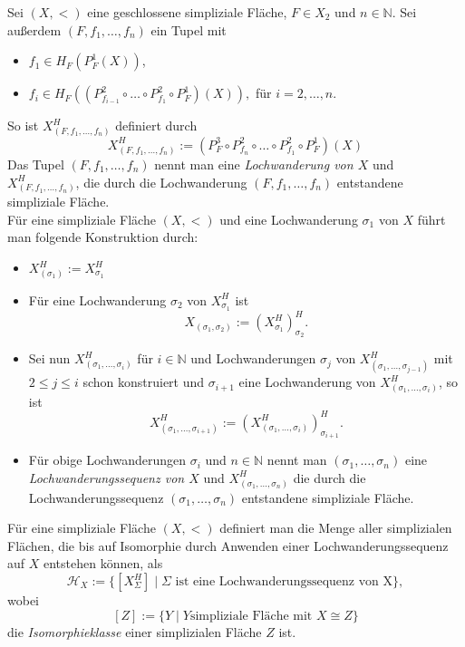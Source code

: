 \documentclass[12pt,titlepage]{article}
\begin{document}
\begin{definition}
Sei $(X,<)$ eine geschlossene simpliziale Fläche, $F \in X_2$ und $n\in \mathbb{N}$. Sei außerdem $(F,f_1,\ldots,f_n)$ ein Tupel mit
\begin{itemize}
\item $f_1 \in H_F(P_F^1(X))$,
\item $f_i \in H_F((P^2_{f_{i-1}} \circ \ldots \circ P^2_{f_1}\circ P_F^1 )(X)),$ für $i=2,\ldots ,n$.
\end{itemize}
So ist $X_{(F,f_1,\ldots,f_n)}^H$ definiert durch 
\[
X^{H}_{(F,f_1,\ldots,f_n)}:=(P_F^3\circ P^2_{f_n} \circ \ldots \circ P^2_{f_1}\circ P_F^1)(X)
\]
Das Tupel $(F,f_1,\ldots,f_n)$ nennt man eine \emph{Lochwanderung von $X$} und $X^H_{(F,f_1,\ldots,f_n)}$, die durch die Lochwanderung $(F,f_1,\ldots,f_n)$ entstandene simpliziale Fläche.\\
Für eine simpliziale Fläche $(X,<)$ und eine Lochwanderung $\sigma_1$ von $X$ führt man folgende Konstruktion durch:
\begin{itemize}
\item $X^H_{(\sigma_1)}:=X^H_{\sigma_1}$
\item Für eine Lochwanderung $\sigma_2$ von $X^H_{\sigma_1}$ ist 
\[
X_{(\sigma_1,\sigma_2)}:=(X_{\sigma_1}^H)^H_{\sigma_2}.
\]
\item Sei nun  $X_{(\sigma_1,\ldots, \sigma_i)}^H$ für $i\in \mathbb{N}$ und Lochwanderungen $\sigma_j$ von $X^H_{(\sigma_1,\ldots,\sigma_{j-1})}$ mit $2 \leq j \leq i$ schon konstruiert und $\sigma_{i+1}$ eine Lochwanderung von $X_{(\sigma_1,\ldots, \sigma_i)}^H$, so ist
\[
X_{(\sigma_1,\ldots, \sigma_{i+1})}^H:=(X_{(\sigma_1,\ldots, \sigma_i)}^H)^H_{\sigma_{i+1}}.
\]
\item Für obige Lochwanderungen $\sigma_i$ und $n \in \mathbb{N}$ nennt man $(\sigma_1, \ldots,\sigma_n)$ eine \emph{Lochwanderungssequenz von $X$} und $X^H_{(\sigma_1,\ldots,\sigma_n)}$ die durch die Lochwanderungssequenz $(\sigma_1,\ldots,\sigma_n)$ entstandene simpliziale Fläche.
\end{itemize}
\end{definition}


\begin{definition}
Für eine simpliziale Fläche $(X,<)$ definiert man die Menge aller simplizialen Flächen, die bis auf Isomorphie durch Anwenden einer Lochwanderungssequenz auf $X$ entstehen können, als
\[
\mathcal{H}_X:=\{[X_{\Sigma}^H] \mid \Sigma \text{ ist eine Lochwanderungssequenz von X}\},
\]
wobei
\[
 [Z] := \{Y \mid Y \text{simpliziale Fläche mit } X \cong Z\}
\] die \emph{Isomorphieklasse} einer simplizialen Fläche  $Z$ ist. 

\end{definition}
\end{document}
